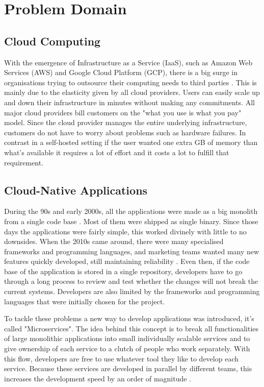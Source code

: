\section{Problem Domain}

\subsection{Cloud Computing}
With the emergence of Infrastructure as a Service (IaaS), such as Amazon Web Services (AWS) and Google Cloud Platform (GCP), there is a big surge in organisations trying to outsource their computing needs to third parties \citep{rimol_2021}. This is mainly due to the elasticity given by all cloud providers. Users can easily scale up and down their infrastructure in minutes without making any commitments. All major cloud providers bill customers on the "what you use is what you pay" model. Since the cloud provider manages the entire underlying infrastructure, customers do not have to worry about problems such as hardware failures. In contrast in a self-hosted setting if the user wanted one extra GB of memory than what's available it requires a lot of effort and it costs a lot to fulfill that requirement.

\subsection{Cloud-Native Applications}
During the 90s and early 2000s, all the applications were made as a big monolith from a single code base \citep{LessonsF52:online}. Most of them were shipped as single binary. Since those days the applications were fairly simple, this worked divinely with little to no downsides. When the 2010s came around, there were many specialised frameworks and programming languages, and marketing teams wanted many new features quickly developed, still maintaining reliability \citep{di2018migrating,Microser52:online}. Even then, if the code base of the application is stored in a single repository, developers have to go through a long process to review and test whether the changes will not break the current systems. Developers are also limited by the frameworks and programming languages that were initially chosen for the project.

To tackle these problems a new way to develop applications was introduced, it's called "Microservices". The idea behind this concept is to break all functionalities of large monolithic applications into small individually scalable services and to give ownership of each service to a clutch of people who work separately. With this flow, developers are free to use whatever tool they like to develop each service. Because these services are developed in parallel by different teams, this increases the development speed by an order of magnitude \citep{Understa56:online}.

